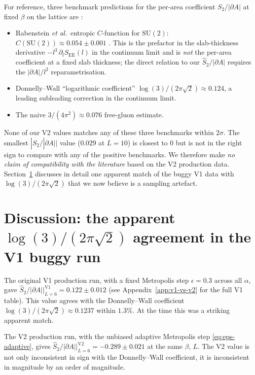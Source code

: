\documentclass[11pt,a4paper]{article}
\theoremstyle{definition}
\newcommand{\SUtwo}{\mathrm{SU}(2)}
\begin{document}
For reference, three benchmark predictions for the per-area
coefficient $S_2/|\partial A|$ at fixed $\beta$ on the lattice are
\cite{Rabenstein2019,DonnellyWall2014,DonnellyWall2015}:
\begin{itemize}
   \item Rabenstein \emph{et al.}\ entropic $C$-function for $\SUtwo$:
         $C(\SUtwo) \approx 0.054 \pm 0.001$
         \cite[Fig.~3]{Rabenstein2019}. This is the prefactor in the
         slab-thickness derivative $-l^{3}\,\partial_{l} S_{\mathrm{EE}}(l)$
         in the continuum limit and is \emph{not} the per-area
         coefficient at a fixed slab thickness; the direct relation to
         our $\widehat S_2/|\partial A|$ requires the
         $|\partial A|/l^{2}$ reparametrisation.
   \item Donnelly--Wall \cite{DonnellyWall2015} ``logarithmic
         coefficient'' $\log(3)/(2\pi\sqrt{2}) \approx 0.124$, a
         leading subleading correction in the continuum limit.
   \item The naive $3/(4\pi^{2}) \approx 0.076$ free-gluon estimate.
\end{itemize}
None of our V2 values matches any of these three benchmarks within
$2\sigma$. The smallest $|\widehat S_2/|\partial A||$ value
($0.029$ at $L=10$) is closest to $0$ but is not in the right sign
to compare with any of the positive benchmarks. We therefore make
\emph{no claim of compatibility with the literature} based on the
V2 production data. Section~\ref{sec:logthree-discussion} discusses
in detail one apparent match of the buggy V1 data with
$\log(3)/(2\pi\sqrt{2})$ that we now believe is a sampling artefact.

\section{Discussion: the apparent
         \texorpdfstring{$\log(3)/(2\pi\sqrt 2)$}{log(3)/(2pi sqrt 2)} agreement
         in the V1 buggy run}
\label{sec:logthree-discussion}

The original V1 production run, with a fixed Metropolis step
$\epsilon = 0.3$ across all $\alpha$, gave
$\widehat S_2/|\partial A|\big|_{L=6}^{\mathrm{V1}} = 0.122 \pm 0.012$
(see Appendix~\ref{app:v1-vs-v2} for the full V1 table). This
value agrees with the Donnelly--Wall coefficient
$\log(3)/(2\pi\sqrt 2) \approx 0.1237$ within $1.3\%$. At the time
this was a striking apparent match.

The V2 production run, with the unbiased adaptive Metropolis step
\eqref{eq:eps-adaptive}, gives
$\widehat S_2/|\partial A|\big|_{L=6}^{\mathrm{V2}} = -0.289 \pm
0.021$ at the same $\beta$, $L$. The V2 value is not only
inconsistent in sign with the Donnelly--Wall coefficient, it is
inconsistent in magnitude by an order of magnitude.
\end{document}
